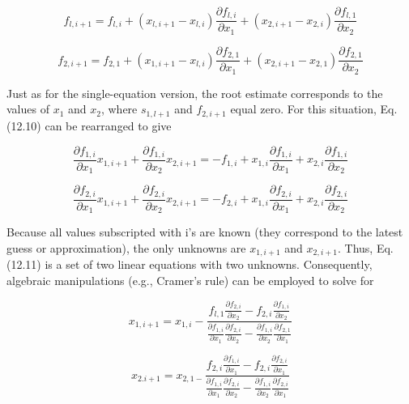 \documentclass[../main.tex]{subfiles}
\begin{document}
\begin{equation}
f_{l,i+1}=f_{l,i}+(x_{l,i+1}-x_{l,i})\frac{\partial f_{l,i}}{\partial x_{1}}+(x_{2,i+1}-x_{2,i})\frac{\partial f_{l,1}}{\partial x_{2}}
\tag{12.10a}
\end{equation}

\begin{equation}
f_{2,i+1}=f_{2,1}+(x_{1,i+1}-x_{l,i})\frac {\partial f_{2,1}}{\partial x_{1}}+(x_{2,i+1}-x_{2,1})\frac{\partial f_{2,1}}{\partial x_{2}}
\tag{12.10b}
\end{equation}

Just as for the single-equation version, the root estimate corresponds to the values of $x_{1}$ and
$x_{2}$, where $s_{1,l+1}$ and $f_{2, i+1}$ equal zero. For this situation, Eq. (12.10) can be rearranged to give

\begin{equation}
\frac{\partial f_{1,i}}{\partial x_{1}}x_{1,i+1}+\frac{\partial f_{1,i}}{\partial x_{2}}x_{2,i+1}=-f_{1,i}+x_{1,i}\frac{\partial f_{1,i}}{\partial x_{1}}+x_{2,i}\frac {\partial f_{1,i}}{\partial x_{2}}
\tag{12.11a}
\end{equation}

\begin{equation}
\frac{\partial f_{2,i}}{\partial x_{1}}x_{1,i+1}+\frac{\partial f_{2,i}}{\partial x_{2}}x_{2,i+1}=-f_{2,i}+x_{1,i}\frac{\partial f_{2,i}}{\partial x_{1}}+x_{2,i}\frac {\partial f_{2,i}}{\partial x_{2}}
\tag{12.11b}
\end{equation}

Because all values subscripted with i's are known (they correspond to the latest guess or
approximation), the only unknowns are $x_{1,i+1}$ and $x_{2,i+1}$. Thus, Eq. (12.11) is a set of
two linear equations with two unknowns. Consequently, algebraic manipulations (e.g.,
Cramer's rule) can be employed to solve for

\begin{equation}
x_{1,i+1}=
x_{1,i}-
\frac{f_{l,1}
\frac{\partial f_{2,i}}{\partial x_{2}}-f_{2,i}\frac{\partial f_{1,i}}{\partial x_{2}}}{\frac{\partial f_{1,i}}{\partial x_{1}}\frac{\partial f_{2,i}}{\partial x_{2}}-\frac{\partial f_{1,i}}{\partial x_{2}}\frac{\partial f_{2,1}}{\partial x_{1}}}
\tag{12.12a}
\end{equation}

\begin{equation}
x_{2.i+1}=x_{2,1-}
\frac{f_{2,i}\frac{\partial f_{1,i} }{\partial x_{1}}-f_{2,i}\frac{\partial f_{2,i}}{\partial x_{1}}}{\frac{\partial f_{1,i}}{\partial x_{1}}\frac{\partial f_{2,i}}{\partial x_{2}}-\frac{\partial f_{1,i}}{\partial x_{2}}\frac{\partial f_{2,i}}{\partial x_{1}}}
\tag{12.12b}
\end{equation}
\end{document}
